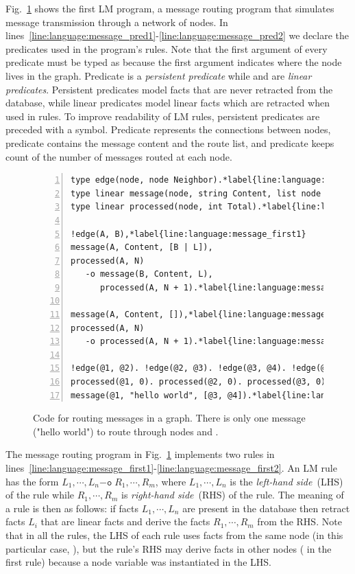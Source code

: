 
Fig.~\ref{code:language:message} shows the first LM program, a message routing
program that simulates message transmission through a network of nodes. In
lines~\ref{line:language:message_pred1}-\ref{line:language:message_pred2} we
declare the predicates used in the program's rules. Note that the first argument
of every predicate must be typed as  because the first argument
indicates where the node lives in the graph.  Predicate  is a
\emph{persistent predicate} while  and  are
\emph{linear predicates}. Persistent predicates model facts that are never
retracted from the database, while linear predicates model linear facts which
are retracted when used in rules. To improve readability of LM rules, persistent
predicates are preceded with a \code{!} symbol. Predicate  represents
the connections between nodes, predicate  contains the message
content and the route list, and predicate  keeps count of the
number of messages routed at each node.

\begin{figure}[h!]
\begin{Verbatim}[numbers=left,commandchars=\*\{\},fontsize=\codesize]
type edge(node, node Neighbor).*label{line:language:message_pred1}
type linear message(node, string Content, list node Routing).
type linear processed(node, int Total).*label{line:language:message_pred2}

!edge(A, B),*label{line:language:message_first1}
message(A, Content, [B | L]),
processed(A, N)
   -o message(B, Content, L),
      processed(A, N + 1).*label{line:language:message_first2}

message(A, Content, []),*label{line:language:message_second1}
processed(A, N)
   -o processed(A, N + 1).*label{line:language:message_second2}

!edge(@1, @2). !edge(@2, @3). !edge(@3, @4). !edge(@1, @3).
processed(@1, 0). processed(@2, 0). processed(@3, 0). processed(@4, 0).
message(@1, "hello world", [@3, @4]).*label{line:language:message_message}
\end{Verbatim}
\caption{Code for routing messages in a graph. There is only one message ("hello
world") to route through nodes  and .}
\label{code:language:message}
\end{figure}

The message routing program in Fig.~\ref{code:language:message} implements two
rules in
lines~\ref{line:language:message_first1}-\ref{line:language:message_first2}. An
LM rule has the form $L_1, \cdots, L_n \mathtt{-o} \; R_1, \cdots, R_m$, where
$L_1, \cdots, L_n$ is the \emph{left-hand side}~(LHS) of the rule while $R_1,
\cdots, R_m$ is \emph{right-hand side}~(RHS) of the rule. The meaning of a rule
is then as follows: if facts $L_1, \cdots, L_n$ are present in the database then
retract facts $L_i$ that are linear facts and derive the facts $R_1, \cdots,
R_m$ from the RHS. Note that in all the rules, the LHS of each rule uses facts
from the same node (in this particular case, ), but the rule's RHS may
derive facts in other nodes ( in the first rule) because a node variable
was instantiated in the LHS.

